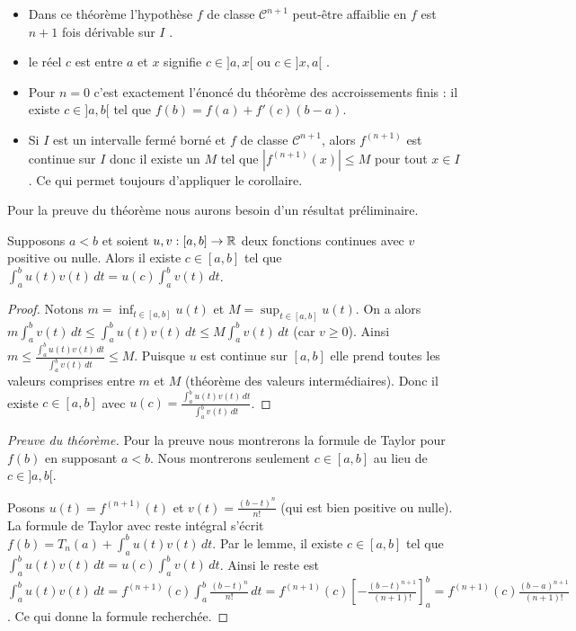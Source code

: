 \documentclass[class=report,crop=false]{standalone}
\begin{document}
\begin{remarque*}
\sauteligne
\begin{itemize}
  \item Dans ce théorème l'hypothèse $f$ de classe $\mathcal{C}^{n+1}$ peut-être affaiblie
en $f$ est \og $n+1$ fois dérivable sur $I$ \fg{}.

  \item \og le réel $c$ est entre $a$ et $x$ \fg{} signifie \og $c\in ]a,x[$ ou $c\in ]x,a[$ \fg{}.

  \item Pour $n=0$ c'est exactement l'énoncé du théorème des accroissements finis :
il existe $c\in]a,b[$ tel que $f(b)=f(a)+f'(c)(b-a)$.

  \item Si $I$ est un intervalle fermé borné et $f$ de classe $\mathcal{C}^{n+1}$,
alors $f^{(n+1)}$ est continue sur $I$ donc il existe un $M$ tel que
$|f^{(n+1)}(x)|\le M$ pour tout $x\in I$. Ce qui permet toujours d'appliquer le corollaire.
\end{itemize}
\end{remarque*}

Pour la preuve du théorème nous aurons besoin d'un résultat préliminaire.
\begin{lemme}
Supposons $a<b$ et soient $u,v : [a,b] \to \mathbb{R}$ deux fonctions continues avec $v$ positive ou nulle.
Alors il existe $c\in[a,b]$ tel que $\int_a^b u(t)v(t)\, dt = u(c) \int_a^b v(t)\, dt$.
\end{lemme}

\begin{proof}
Notons $m = \inf_{t\in[a,b]} u(t)$ et $M=\sup_{t\in[a,b]} u(t)$.
On a alors $m\int_a^b v(t)\, dt \le \int_a^b u(t)v(t)\, dt\le M\int_a^b v(t)\, dt$ (car $v\ge0$).
Ainsi $m \le \frac{\int_a^b u(t)v(t)\, dt}{\int_a^b v(t)\, dt }\le M$.
Puisque $u$ est continue sur $[a,b]$ elle prend toutes les valeurs comprises entre $m$ et $M$
(théorème des valeurs intermédiaires). Donc il existe $c \in[a,b]$ avec
$u(c)=\frac{\int_a^b u(t)v(t)\, dt}{\int_a^b v(t)\, dt}$.
\end{proof}


\begin{proof}[Preuve du théorème]
Pour la preuve nous montrerons la formule de Taylor pour $f(b)$ en supposant $a<b$.
Nous montrerons seulement $c\in [a,b]$ au lieu de $c\in ]a,b[$.

Posons $u(t)=f^{(n+1)}(t)$ et $v(t)= \frac{(b-t)^n}{n!}$ (qui est bien positive ou nulle).
La formule de Taylor avec reste intégral s'écrit
$f(b) = T_n(a)+ \int_a^b u(t)v(t) \, dt$.
Par le lemme, il existe $c\in[a,b]$ tel que
$\int_a^b u(t)v(t) \, dt = u(c) \int_a^b v(t)\, dt$.
Ainsi le reste est
$\int_a^b u(t)v(t) \, dt = f^{(n+1)}(c) \int_a^b \frac{(b-t)^n}{n!} \, dt
=f^{(n+1)}(c) \left[ -\frac{(b-t)^{n+1}}{(n+1)!} \right]_a^b
= f^{(n+1)}(c)  \frac{(b-a)^{n+1}}{(n+1)!}$.
Ce qui donne la formule recherchée.
\end{proof}
\end{document}
